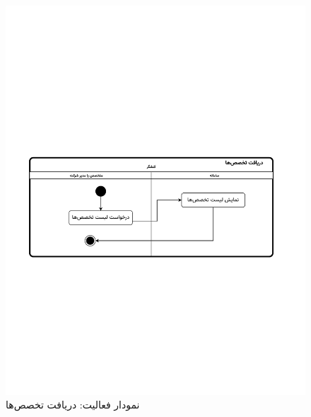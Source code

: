 \begin{figure}[ht!]
	\centering
	\includegraphics[scale=0.6, page=1]{figs/OOD-activity-getspec.pdf}
	\caption{نمودار فعالیت: دریافت تخصص‌ها}
\end{figure}
\FloatBarrier
\newpage


